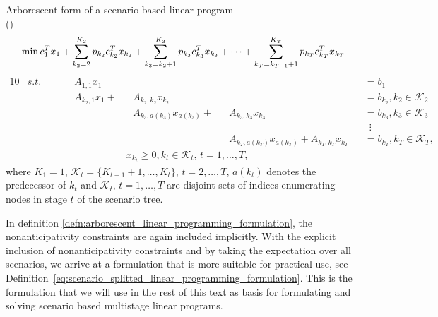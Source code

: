 \begin{defn}{\normalfont Arborescent form of a scenario based linear program}
\label{defn:arborescent_linear_programming_formulation} \\
{\normalfont (\cite[p. 3]{dupacova_scenarios_for_multistage_stochastic_programs})}
\\
\footnotesize
\begin{equation}
\mathrm{min} \, c_1^Tx_1 + \sum_{k_2=2}^{K_2}p_{k_2}c_{k_2}^Tx_{k_2} + \sum_{k_3=k_2+1}^{K_3}p_{k_3}c_{k_3}^Tx_{k_3} + \dots +  \sum_{k_T=k_{T-1}+1}^{K_T}p_{k_T}c_{k_T}^Tx_{k_T} \\
\end{equation}
\vspace{-0.5cm}
\begin{alignat}{10}
& s.t. && \, && A_{1,1}x_1 && && \,&&=b_1 \nonumber \\
& && && A_{k_2,1}x_1  + &&A_{k_2,k_2}x_{k_2} && &&=b_{k_2}, k_2 \in \mathcal{K}_2 \nonumber \\
& && && && A_{k_3,a(k_3)}x_{a(k_3)}  + && A_{k_3,k_3}x_{k_3} &&=b_{k_3} , k_3 \in \mathcal{K}_3 \nonumber \\
& && && && && &&  \, \, \, \vdots \nonumber \\
& && && && && A_{k_T,a(k_T)}x_{a(k_T)}  +  A_{k_T,k_T}x_{k_T} &&=b_{k_T} , k_T \in \mathcal{K}_T, \nonumber
\end{alignat}
\vspace{-0.5cm}
\begin{align*}
& x_{k_t} \geq 0, k_t \in \mathcal{K}_t, \, t=1,\dots,T,  \nonumber
\end{align*}
\normalsize
where $K_1=1$, $\mathcal{K}_t=\{K_{t-1}+1,\dots,K_t\}, \, t=2,\dots,T$, $a(k_t)$ denotes the predecessor of $k_t$ and $\mathcal{K}_t, \, t=1,\dots,T$ are disjoint sets of indices enumerating nodes in stage $t$ of the scenario tree.
\end{defn}
In definition \ref{defn:arborescent_linear_programming_formulation}, the nonanticipativity constraints are again included implicitly. With the explicit inclusion of nonanticipativity constraints and by taking the expectation over all scenarios, we arrive at a formulation that is more suitable for practical use, see Definition~\ref{eq:scenario_splitted_linear_programming_formulation}. This is the formulation that we will use in the rest of this text as basis for formulating and solving scenario based multistage linear programs.
\newpage
